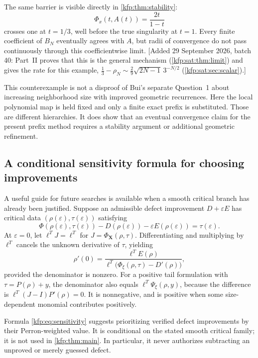 \documentclass[11pt,a4paper]{article}
\theoremstyle{definition}
\theoremstyle{remark}
\newcommand{\bX}{\boldsymbol X}
\begin{document}
The same barrier is visible directly in \cref{kfp:thm:stability}:
\[
 \Phi_x(t,A(t))=\frac{2t}{1-t}
\]
crosses one at $t=1/3$, well before the true singularity at $t=1$.
Every finite coefficient of $B_N$ eventually agrees with $A$, but radii of
convergence do not pass continuously through this coefficientwise limit.
[Added 29 September 2026, batch 40: Part~II proves that this is the general
mechanism (\cref{kfp:sat:thm:limit}) and gives the rate for this example,
$\frac13-\rho_N\sim\frac29\sqrt{2N-1}\,3^{-N/2}$
(\cref{kfp:sat:sec:scalar}).]

This counterexample is not a disproof of Bui's separate Question~1 about
increasing neighborhood size with improved geometric recurrences. Here the
local polynomial map is held fixed and only a finite exact prefix is
substituted. Those are different hierarchies. It does show that an eventual
convergence claim for the present prefix method requires a stability argument
or additional geometric refinement.

\subsection{A conditional sensitivity formula for choosing improvements}
A useful guide for future searches is available when a smooth critical branch
has already been justified. Suppose an admissible defect improvement
$D+\varepsilon E$ has critical data $(\rho(\varepsilon),\tau(\varepsilon))$
satisfying
\[
 \Phi(\rho(\varepsilon),\tau(\varepsilon))
 -D(\rho(\varepsilon))-\varepsilon E(\rho(\varepsilon))
 =\tau(\varepsilon).
\]
At $\varepsilon=0$, let $\ell^TJ=\ell^T$ for
$J=\Phi_{\bX}(\rho,\tau)$. Differentiating and multiplying by $\ell^T$
cancels the unknown derivative of $\tau$, yielding
\begin{equation}\label{kfp:eq:sensitivity}
 \rho'(0)=
 \frac{\ell^TE(\rho)}
      {\ell^T\bigl(\Phi_\xi(\rho,\tau)-D'(\rho)\bigr)},
\end{equation}
provided the denominator is nonzero.
For a positive tail formulation with $\tau=P(\rho)+y$, the denominator
also equals $\ell^T\Psi_\xi(\rho,y)$, because the difference is
$\ell^T(J-I)P'(\rho)=0$. It is nonnegative, and is positive when some
size-dependent monomial contributes positively.

Formula \eqref{kfp:eq:sensitivity} suggests prioritizing verified defect
improvements by their Perron-weighted value. It is conditional on the stated
smooth critical family; it is not used in \cref{kfp:thm:main}. In particular,
it never authorizes subtracting an unproved or merely guessed defect.
\end{document}
